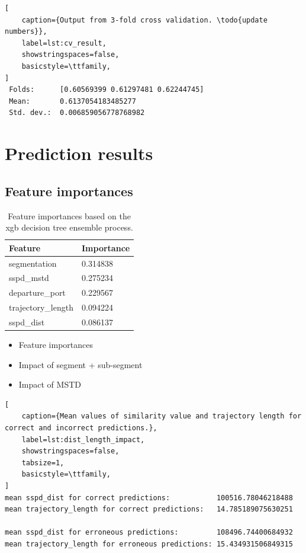 \begin{lstlisting}[
    caption={Output from 3-fold cross validation. \todo{update numbers}},
    label=lst:cv_result,
    showstringspaces=false,
    basicstyle=\ttfamily,
]
 Folds:      [0.60569399 0.61297481 0.62244745]
 Mean:       0.6137054183485277
 Std. dev.:  0.006859056778768982
\end{lstlisting}

\section{Prediction results}

\subsection{Feature importances}

\begin{table}[htbp]
    \centering
    \begin{tabularx}{0.6\textwidth}{X X}
        \bfseries{Feature}  & \bfseries{Importance} \\ \toprule
        segmentation        & 0.314838 \\ \midrule
        sspd\_mstd          & 0.275234 \\ \midrule
        departure\_port     & 0.229567 \\ \midrule
        trajectory\_length  & 0.094224 \\ \midrule
        sspd\_dist          & 0.086137 \\ \bottomrule
    \end{tabularx}
    \caption{Feature importances based on the \acrshort{xgb} decision tree ensemble process. }\label{tab:feature_importances}
\end{table}


\begin{itemize}
    \item Feature importances
    \item Impact of segment + sub-segment
    \item Impact of MSTD
\end{itemize}

\begin{lstlisting}[
    caption={Mean values of similarity value and trajectory length for correct and incorrect predictions.},
    label=lst:dist_length_impact,
    showstringspaces=false,
    tabsize=1,
    basicstyle=\ttfamily,
]
mean sspd_dist for correct predictions:           100516.78046218488
mean trajectory_length for correct predictions:   14.785189075630251

mean sspd_dist for erroneous predictions:         108496.74400684932
mean trajectory_length for erroneous predictions: 15.434931506849315
\end{lstlisting}

